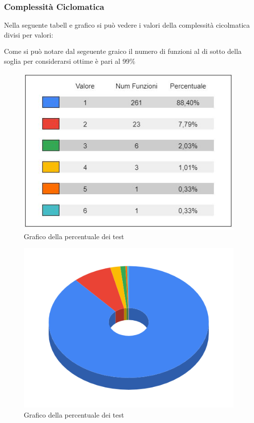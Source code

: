     \newpage
\subsubsection{Complessità Ciclomatica}
    Nella seguente tabell e grafico si può vedere i valori della complessità cicolmatica divisi per valori:

        Come si può notare dal segeuente graico il numero di funzioni al di sotto della soglia per considerarsi ottime è pari al 99\%



    \begin{figure}[H]
        \centering
        \includegraphics[width=10 cm]{source/sections/images/tabella_CC.JPG}
        \caption{Grafico della percentuale dei test}
    \end{figure}

    \begin{figure}[H]
        \centering
        \includegraphics[width=10 cm]{source/sections/images/CC.png}
        \caption{Grafico della percentuale dei test}
    \end{figure}

